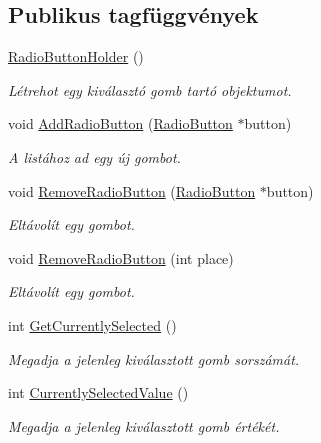 \subsection*{Publikus tagfüggvények}
\begin{DoxyCompactItemize}
\item 
\hyperlink{class_radio_button_holder_ab100a3d26a036b76ead2bcd4331e8552}{Radio\+Button\+Holder} ()
\begin{DoxyCompactList}\small\item\em Létrehot egy kiválasztó gomb tartó objektumot. \end{DoxyCompactList}\item 
void \hyperlink{class_radio_button_holder_ab9ac730a7440439eb73b892f193741ae}{Add\+Radio\+Button} (\hyperlink{class_radio_button}{Radio\+Button} $\ast$button)
\begin{DoxyCompactList}\small\item\em A listához ad egy új gombot. \end{DoxyCompactList}\item 
void \hyperlink{class_radio_button_holder_a217e5620f70f0d2633e70896ad166f70}{Remove\+Radio\+Button} (\hyperlink{class_radio_button}{Radio\+Button} $\ast$button)
\begin{DoxyCompactList}\small\item\em Eltávolít egy gombot. \end{DoxyCompactList}\item 
void \hyperlink{class_radio_button_holder_a8a44f58d480a8c1b4822adb9e9df0c98}{Remove\+Radio\+Button} (int place)
\begin{DoxyCompactList}\small\item\em Eltávolít egy gombot. \end{DoxyCompactList}\item 
int \hyperlink{class_radio_button_holder_ad185ab84d978e645eac54f236069705b}{Get\+Currently\+Selected} ()
\begin{DoxyCompactList}\small\item\em Megadja a jelenleg kiválasztott gomb sorszámát. \end{DoxyCompactList}\item 
int \hyperlink{class_radio_button_holder_a5ed73396ddd57f3de474a7487429bae3}{Currently\+Selected\+Value} ()
\begin{DoxyCompactList}\small\item\em Megadja a jelenleg kiválasztott gomb értékét. \end{DoxyCompactList}\item 

\end{DoxyCompactItemize}
